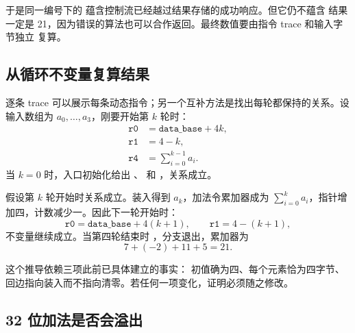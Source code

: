 于是同一编号下的  蕴含控制流已经越过结果存储的成功响应。但它仍不蕴含
结果一定是 21，因为错误的算法也可以合作返回。最终数值要由指令 trace 和输入字节独立
复算。

\begin{center}
\end{center}

\subsection{从循环不变量复算结果}

逐条 trace 可以展示每条动态指令；另一个互补方法是找出每轮都保持的关系。设输入数组为
\(a_0,\ldots,a_3\)，刚要开始第 \(k\) 轮时：
\[
\begin{aligned}
\texttt{r0} &= \texttt{data\_base}+4k,\\
\texttt{r1} &= 4-k,\\
\texttt{r4} &= \sum_{i=0}^{k-1}a_i.
\end{aligned}
\]
当 \(k=0\) 时，入口初始化给出 、 和
，关系成立。

假设第 \(k\) 轮开始时关系成立。装入得到 \(a_k\)，加法令累加器成为
\(\sum_{i=0}^{k}a_i\)，指针增加四，计数减少一。因此下一轮开始时：
\[
\texttt{r0}=\texttt{data\_base}+4(k+1),\qquad
\texttt{r1}=4-(k+1),
\]
不变量继续成立。当第四轮结束时 ，分支退出，累加器为
\[
7+(-2)+11+5=21.
\]

这个推导依赖三项此前已具体建立的事实： 初值确为四、每个元素恰为四字节、
回边指向装入而不指向清零。若任何一项变化，证明必须随之修改。

\subsection{32 位加法是否会溢出}

